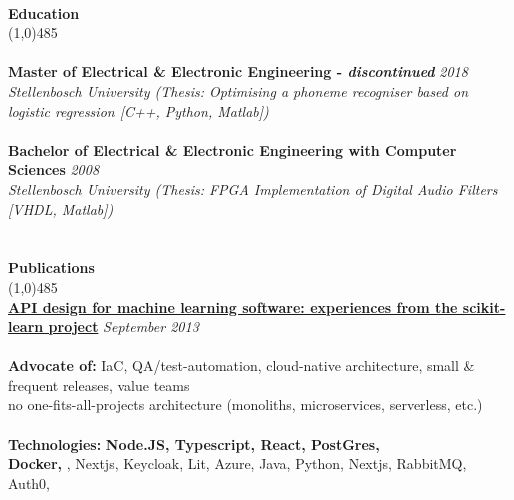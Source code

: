 \documentclass[9pt]{extarticle}
\newcommand\tab[1][1cm]{\hspace*{#1}}
\newcommand\smallspace[1][0.23cm]{\hspace*{#1}}
\newcommand\negativespace[1][-0.12cm]{\hspace*{#1}}
\begin{document}
\noindent %
\\
\vspace*{-6pt}
{\negativespace \Large \bf Education}\\
\line(1,0){485}\\
\\
\noindent
{\bf Master of Electrical & Electronic Engineering - \textit{discontinued}} \hfill \textit{2018} \\
\textit{Stellenbosch University (Thesis: Optimising a phoneme recogniser based on logistic regression [C++, Python, Matlab])} \\\\
\noindent
{\bf Bachelor of Electrical & Electronic Engineering with Computer Sciences} \hfill \textit{2008} \\
\textit{Stellenbosch University (Thesis: FPGA Implementation of Digital Audio Filters [VHDL, Matlab])} \\
\\
\\
\vspace*{-6pt}
{\negativespace \Large \bf Publications}\\
\line(1,0){485}\\
{\bf \href{https://paperswithcode.com/paper/api-design-for-machine-learning-software}{API design for machine learning software: experiences from the scikit-learn project}} \hfill \textit{September 2013} \\
\\

\noindent
{\bf Advocate of:}  IaC, QA/test-automation, cloud-native architecture, small \& frequent releases, value teams\\
 \tab \tab \smallspace no one-fits-all-projects architecture (monoliths, microservices, serverless, etc.) \\ \\
\noindent
{\bf Technologies:} \textbf{Node.JS, Typescript, React, PostGres, \\
\tab \tab \smallspace  Docker, }, Nextjs, Keycloak, Lit, Azure, Java, Python, Nextjs, RabbitMQ, Auth0, \\
\end{document}
